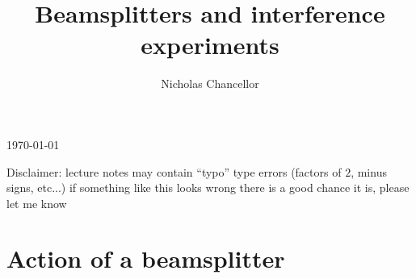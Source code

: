 \documentclass[english]{article}
\begin{document}
\title{Beamsplitters and interference experiments}
\author{Nicholas Chancellor}


\maketitle


\today %


{\small Disclaimer: lecture notes may contain ``typo'' type errors (factors of $2$, minus signs, etc...) if something like this looks wrong there is a good chance it is, please let me know}

\section{Action of a beamsplitter}
\end{document}
